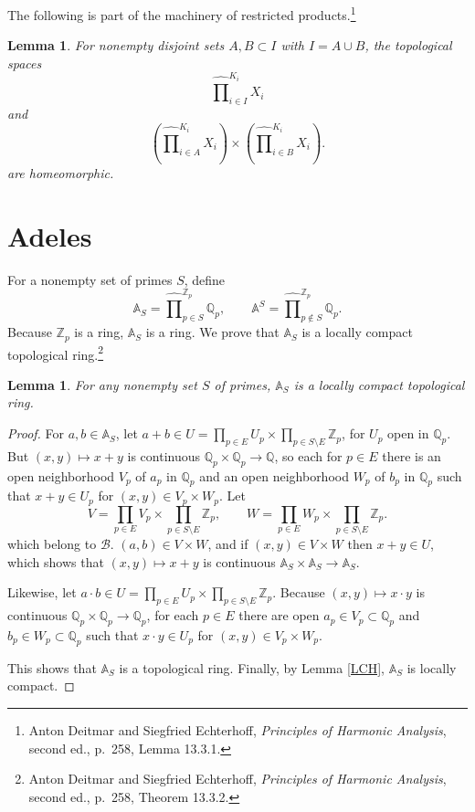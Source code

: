 \documentclass{article}
\newtheorem{lemma}[theorem]{Lemma}
\theoremstyle{definition}
\begin{document}
The following is part of the machinery of restricted products.\footnote{Anton Deitmar and Siegfried Echterhoff,
{\em Principles of Harmonic Analysis}, second ed., p.~258, Lemma 13.3.1.}

\begin{lemma}
For nonempty disjoint sets $A,B \subset I$ with $I = A \cup B$,
the topological spaces
\[
\widehat{\prod}_{i \in I}^{K_i} X_i
\]
and
\[
\left(\widehat{\prod}_{i \in A}^{K_i} X_i\right) \times \left(\widehat{\prod}_{i \in B}^{K_i} X_i\right).
\]
are homeomorphic.
\end{lemma}



\section{Adeles}
For a nonempty set of primes $S$, define
\[
\mathbb{A}_S = \widehat{\prod}_{p \in S}^{\mathbb{Z}_p} \mathbb{Q}_p,
\qquad \mathbb{A}^S = \widehat{\prod}_{p \not \in S}^{\mathbb{Z}_p} \mathbb{Q}_p.
\]
Because $\mathbb{Z}_p$ is a ring, $\mathbb{A}_S$ is a ring. 
We prove that $\mathbb{A}_S$ is a locally compact topological ring.\footnote{Anton Deitmar and Siegfried Echterhoff,
{\em Principles of Harmonic Analysis}, second ed., p.~258, Theorem 13.3.2.}

\begin{lemma}
For any nonempty set $S$ of primes, $\mathbb{A}_S$ is a locally compact topological ring.
\end{lemma}
\begin{proof}
For $a,b \in \mathbb{A}_S$, let 
$a+b \in U = \prod_{p \in E} U_p \times \prod_{p \in S \setminus E} \mathbb{Z}_p$, for $U_p$ open in $\mathbb{Q}_p$.
But $(x,y) \mapsto x+y$ is continuous $\mathbb{Q}_p \times \mathbb{Q}_p \to \mathbb{Q}$, so
each for $p \in E$ there is an open neighborhood $V_p$ of $a_p$ in $\mathbb{Q}_p$
 and an open neighborhood $W_p$ of $b_p$ in $\mathbb{Q}_p$ such that $x+y \in U_p$ for
 $(x,y) \in V_p \times W_p$. 
Let 
\[
V = \prod_{p \in E} V_p \times \prod_{p \in S \setminus E} \mathbb{Z}_p,
\qquad
W = \prod_{p \in E} W_p \times \prod_{p \in S \setminus E} \mathbb{Z}_p.
\]
which belong to $\mathscr{B}$. $(a,b) \in V \times W$, and if 
$(x,y) \in V \times W$ then $x+y \in U$, which shows that $(x,y) \mapsto x+y$ is continuous
$\mathbb{A}_S \times \mathbb{A}_S \to \mathbb{A}_S$.

Likewise, let $a \cdot b \in U = \prod_{p \in E} U_p \times \prod_{p \in S \setminus E} \mathbb{Z}_p$.
Because $(x,y) \mapsto x\cdot y$ is continuous $\mathbb{Q}_p \times \mathbb{Q}_p \to \mathbb{Q}_p$,
for each $p \in E$ there are open $a_p \in V_p \subset \mathbb{Q}_p$ and $b_p \in W_p \subset \mathbb{Q}_p$
such that $x\cdot y \in U_p$ for $(x,y) \in V_p \times W_p$. 

This shows that $\mathbb{A}_S$ is a topological ring. Finally, by Lemma \ref{LCH}, $\mathbb{A}_S$ 
is locally compact.
\end{proof}
\end{document}
